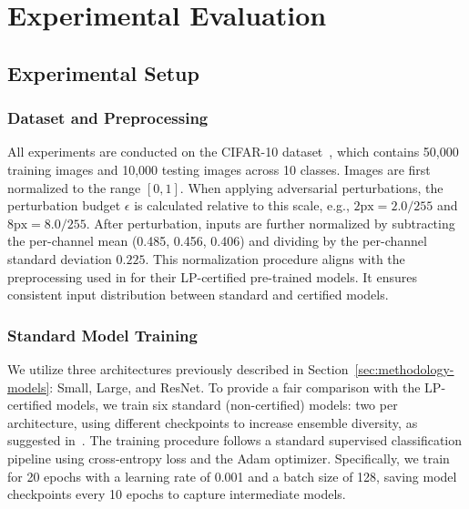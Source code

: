 
\chapter{Experimental Evaluation}

\section{Experimental Setup}

\subsection{Dataset and Preprocessing}
\indent

All experiments are conducted on the CIFAR-10 dataset~\cite{krizhevsky2009learning}, which contains 50,000 training images and 10,000 testing images across 10 classes.
Images are first normalized to the range $[0,1]$. When applying adversarial perturbations, the perturbation budget $\epsilon$ is calculated relative to this scale, e.g., $2\text{px} = 2.0/255$ and $8\text{px} = 8.0/255$.
After perturbation, inputs are further normalized by subtracting the per-channel mean (0.485, 0.456, 0.406) and dividing by the per-channel standard deviation $0.225$. This normalization procedure aligns with the preprocessing used in \cite{wong2018scaling} for their LP-certified pre-trained models. It ensures consistent input distribution between standard and certified models.

\subsection{Standard Model Training}
\indent

We utilize three architectures previously described in Section~\ref{sec:methodology-models}: Small, Large, and ResNet.  
To provide a fair comparison with the LP-certified models, we train six standard (non-certified) models: two per architecture, using different checkpoints to increase ensemble diversity, as suggested in~\cite{fort2024ensemble}. The training procedure follows a standard supervised classification pipeline using cross-entropy loss and the Adam optimizer.  
Specifically, we train for 20 epochs with a learning rate of 0.001 and a batch size of 128, saving model checkpoints every 10 epochs to capture intermediate models.


\noindent


